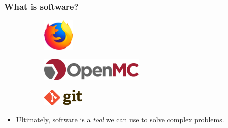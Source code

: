 \begin{frame}
  \frametitle{What is software?}
  \begin{figure}[htpb]
      \centering
      \begin{subfigure}
        \centering
        \includegraphics[width=1.5cm]{images/firefox-logo.png}
      \end{subfigure}
      \begin{subfigure}
        \centering
        \includegraphics[width=5cm]{images/openmc-logo.png}
      \end{subfigure}
      \begin{subfigure}
        \centering
        \includegraphics[width=2cm]{images/git-logo.png}
      \end{subfigure}

  \end{figure}
  \pause\medskip
  \begin{itemize}
      \item Ultimately, software is a {\it tool} we can use to solve complex problems.
  \end{itemize}
\end{frame}


